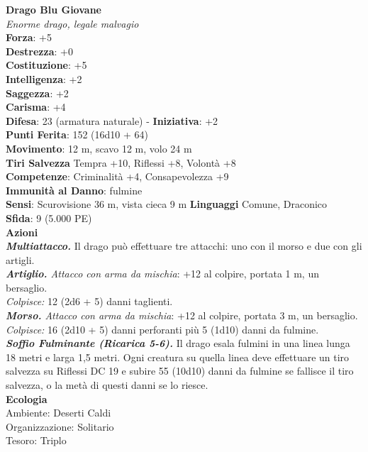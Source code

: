 \begin{multicols}{2}
\medskip\textbf{Drago Blu Giovane}\\
\emph{Enorme drago, legale malvagio}\\
\textbf{Forza}: +5\\
\textbf{Destrezza}: +0\\
\textbf{Costituzione}: +5\\
\textbf{Intelligenza}: +2\\
\textbf{Saggezza}: +2\\
\textbf{Carisma}: +4\\
\textbf{Difesa}: 23 (armatura naturale) - \textbf{Iniziativa}: +2\\
\textbf{Punti Ferita}: 152 (16d10 + 64)\\
\textbf{Movimento}: 12 m, scavo 12 m, volo 24 m\\
\textbf{Tiri Salvezza} Tempra +10, Riflessi +8, Volontà +8\\
\textbf{Competenze}: Criminalità +4, Consapevolezza +9\\
\textbf{Immunità al Danno}: fulmine\\
\textbf{Sensi}: Scurovisione 36 m, vista cieca 9 m
\textbf{Linguaggi} Comune, Draconico\\
\textbf{Sfida}: 9 (5.000 PE)\smallskip\\
\smallskip\textbf{Azioni}\\
\emph{\textbf{Multiattacco.}} Il drago può effettuare tre attacchi: uno con il morso e due con gli artigli.\\
\emph{\textbf{Artiglio.} Attacco con arma da mischia}: +12 al colpire, portata 1 m, un bersaglio.\\
\emph{Colpisce:} 12 (2d6 + 5) danni taglienti.\\
\emph{\textbf{Morso.} Attacco con arma da mischia}: +12 al colpire, portata 3 m, un bersaglio.\\
\emph{Colpisce:} 16 (2d10 + 5) danni perforanti più 5 (1d10) danni da fulmine.\\
\emph{\textbf{Soffio Fulminante (Ricarica 5-6).}} Il drago esala fulmini in una linea lunga 18 metri e larga 1,5 metri. Ogni creatura su quella linea deve effettuare un tiro salvezza su Riflessi DC  19 e subire 55 (10d10) danni da fulmine se fallisce il tiro salvezza, o la metà di questi danni se lo riesce.\\
\textbf{Ecologia}\\
Ambiente: Deserti Caldi\\
Organizzazione: Solitario\\
Tesoro: Triplo\\

\end{multicols}
